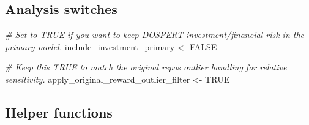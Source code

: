 \documentclass[
]{article}
\newenvironment{Shaded}{\begin{snugshade}}{\end{snugshade}}
\newcommand{\CommentTok}[1]{\textcolor[rgb]{0.56,0.35,0.01}{\textit{#1}}}
\newcommand{\ConstantTok}[1]{\textcolor[rgb]{0.56,0.35,0.01}{#1}}
\newcommand{\NormalTok}[1]{#1}
\newcommand{\OtherTok}[1]{\textcolor[rgb]{0.56,0.35,0.01}{#1}}
\begin{document}
\subsection{Analysis switches}\label{analysis-switches}

\begin{Shaded}
\begin{Highlighting}[]
\CommentTok{\# Set to TRUE if you want to keep DOSPERT investment/financial risk in the primary model.}
\NormalTok{include\_investment\_primary }\OtherTok{\textless{}{-}} \ConstantTok{FALSE}

\CommentTok{\# Keep this TRUE to match the original repo\textquotesingle{}s outlier handling for relative sensitivity.}
\NormalTok{apply\_original\_reward\_outlier\_filter }\OtherTok{\textless{}{-}} \ConstantTok{TRUE}
\end{Highlighting}
\end{Shaded}

\subsection{Helper functions}\label{helper-functions}
\end{document}
